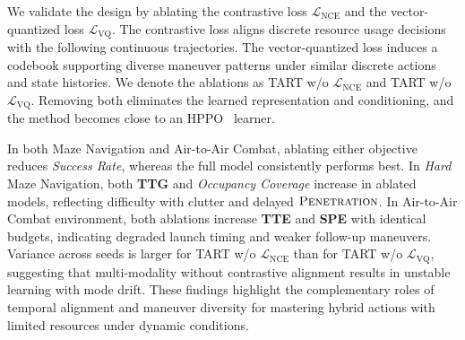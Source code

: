 We validate the design by ablating the contrastive loss $\mathcal{L}_{\text{NCE}}$ and the vector-quantized loss $\mathcal{L}_{\text{VQ}}$.
The contrastive loss aligns discrete resource usage decisions with the following continuous trajectories.
The vector-quantized loss induces a codebook supporting diverse maneuver patterns under similar discrete actions and state histories.
We denote the ablations as TART w/o $\mathcal{L}_{\text{NCE}}$ and TART w/o $\mathcal{L}_{\text{VQ}}$.
Removing both eliminates the learned representation and conditioning, and the method becomes close to an HPPO~\cite{fan2019hybrid} learner.

In both Maze Navigation and Air-to-Air Combat, ablating either objective reduces \emph{Success Rate}, whereas the full model consistently performs best.
In \textit{Hard} Maze Navigation, both \textbf{TTG} and \emph{Occupancy Coverage} increase in ablated models, reflecting difficulty with clutter and delayed $\textsc{Penetration}$.
In Air-to-Air Combat environment, both ablations increase \textbf{TTE} and \textbf{SPE} with identical budgets, indicating degraded launch timing and weaker follow-up maneuvers.
Variance across seeds is larger for TART w/o $\mathcal{L}_{\text{NCE}}$ than for TART w/o $\mathcal{L}_{\text{VQ}}$, suggesting that multi-modality without contrastive alignment results in unstable learning with mode drift.
These findings highlight the complementary roles of temporal alignment and maneuver diversity for mastering hybrid actions with limited resources under dynamic conditions.